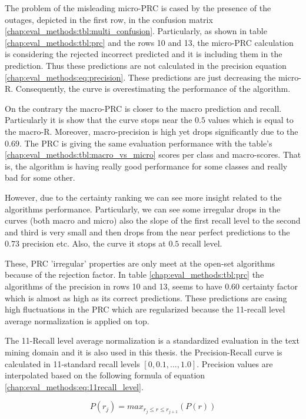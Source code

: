 The problem of the misleading micro-PRC is cased by the presence of the outages, depicted in the first row, in the confusion matrix \ref{chap:eval_methods:tbl:multi_confusion}. Particularly, as shown in table \ref{chap:eval_methods:tbl:prc} and the rows 10 and 13, the micro-PRC calculation is considering the rejected incorrect predicted and it is including them in the prediction. Thus these predictions are not calculated in the precision equation \ref{chap:eval_methods:eq:precision}. These predictions are just decreasing the micro-R. Consequently, the curve is overestimating the performance of the algorithm.

On the contrary the macro-PRC is closer to the macro prediction and recall. Particularly it is show that the curve stops near the $0.5$ values which is equal to the macro-R. Moreover, macro-precision is high yet drops significantly due to the $0.69$. The PRC is giving the same evaluation performance with the table's \ref{chap:eval_methods:tbl:macro_vs_micro} scores per class and macro-scores. That is, the algorithm is having really good performance for some classes and really bad for some other.

However, due to the certainty ranking we can see more insight related to the algorithms performance. Particularly, we can see some irregular drops in the curves (both macro and micro) also the slope of the first recall level to the second and third is very small and then drops from the near perfect predictions to the $0.73$ precision etc. Also, the curve it stops at $0.5$ recall level.

These, PRC 'irregular' properties are only meet at the open-set algorithms because of the rejection factor. In table \ref{chap:eval_methods:tbl:prc} the algorithms of the precision in rows 10 and 13, seems to have $0.60$ certainty factor which is almost as high as its correct predictions. These predictions are casing high fluctuations in the PRC which are regularized because the 11-recall level average normalization is applied on top. 

The 11-Recall level average normalization is a standardized evaluation in the text mining domain and it is also used in this thesis. the Precision-Recall curve is calculated in 11-standard recall levels $[0,0.1,...,1.0]$. Precision values are interpolated based on the following formula of equation \ref{chap:eval_methods:eq:11recall_level}.

\begin{equation}\label{chap:eval_methods:eq:11recall_level}
	P(r_j)=max_{r_j \leqslant r \leqslant r_{j+1}}(P(r))
\end{equation}

